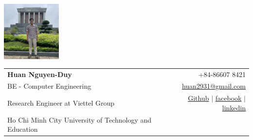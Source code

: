 \documentclass[a4paper,11pt]{article}
\makeatletter
\newcommand{\resumeSubheading}[4]{
\vspace{0.5mm}\item
    \begin{tabular*}{0.98\textwidth}[t]{l@{\extracolsep{\fill}}r}
        \textbf{#1} & \textit{\footnotesize{#4}} \\
        \textit{\footnotesize{#3}} &  \footnotesize{#2}\\
    \end{tabular*}
    \vspace{-2.4mm}
}
\newcommand{\resumeSubHeadingListStart}{\begin{itemize}[leftmargin=*,labelsep=0mm]}
\newcommand{\resumeSubHeadingListEnd}{\end{itemize}\vspace{4mm}}
\newcommand{\name}{Huan Nguyen-Duy} %
\newcommand{\course}{BE - Computer Engineering} %
\newcommand{\phone}{86607 8421} %
\newcommand{\email}{huan2931@gmail.com} %
\newcommand{\github}{Winxkin} %
\newcommand{\facebook}{https://www.facebook.com/xkin.win/} %
\makeatother
\begin{document}
\selectfont
\parbox{3.35cm}{%

\includegraphics[width=3cm,clip]{logo.jpg}

}\parbox{\dimexpr\linewidth-2.8cm\relax}{
\begin{tabularx}{\linewidth}{L r}
  \textbf{\LARGE \name} & +84-\phone\\
  \course &  \href{mailto:\email}{\email}\\
  {Research Engineer at Viettel Group} &  \href{https://github.com/\github}{Github} $|$ \href{\facebook}{facebook} $|$ \href{https://www.linkedin.com/in/}{linkedin}\\
  {Ho Chi Minh City University of Technology and Education} %
\end{tabularx}
}


\end{document}
